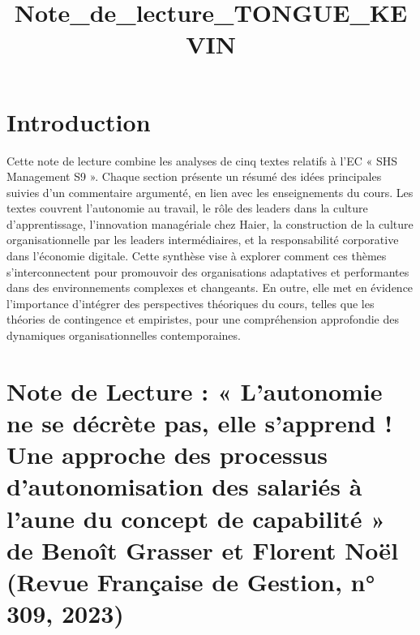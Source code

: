 \documentclass[11pt]{rapportECL}
\title{Note_de_lecture_TONGUE_KEVIN}
\begin{document}
\fairepagedegarde
\tabledematieres
\fontsize{11}{13}\selectfont

\section{Introduction}
Cette note de lecture combine les analyses de cinq textes relatifs à l'EC « SHS Management S9 ». Chaque section présente un résumé des idées principales suivies d'un commentaire argumenté, en lien avec les enseignements du cours. Les textes couvrent l'autonomie au travail, le rôle des leaders dans la culture d'apprentissage, l'innovation managériale chez Haier, la construction de la culture organisationnelle par les leaders intermédiaires, et la responsabilité corporative dans l'économie digitale. Cette synthèse vise à explorer comment ces thèmes s'interconnectent pour promouvoir des organisations adaptatives et performantes dans des environnements complexes et changeants. En outre, elle met en évidence l'importance d'intégrer des perspectives théoriques du cours, telles que les théories de contingence et empiristes, pour une compréhension approfondie des dynamiques organisationnelles contemporaines.

\section{Note de Lecture : « L’autonomie ne se décrète pas, elle s’apprend ! Une approche des processus d’autonomisation des salariés à l’aune du concept de capabilité » de Benoît Grasser et Florent Noël (Revue Française de Gestion, n° 309, 2023)}
\end{document}
